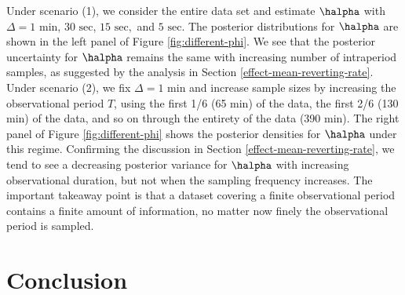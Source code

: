 Under scenario (1), we consider the entire data set and estimate $\halpha$ with $\Delta = 1 \mbox{ min}$, $30 \mbox{ sec}$, $15 \mbox{ sec},$ and $5 \mbox{ sec}$. The posterior distributions for $\halpha$ are shown in the left panel of Figure \ref{fig:different-phi}. We see that the posterior uncertainty for $\halpha$ remains the same with increasing number of intraperiod samples, as suggested by the analysis in Section \ref{effect-mean-reverting-rate}. Under scenario (2), we fix $\Delta = 1 \mbox{ min}$ and increase sample sizes by increasing the observational period $T$, using the first 1/6 (65 min) of the data, the first 2/6 (130 min) of the data, and so on through the entirety of the data (390 min). The right panel of Figure \ref{fig:different-phi} shows the posterior densities for $\halpha$ under this regime. Confirming the discussion in Section \ref{effect-mean-reverting-rate}, we tend to see a decreasing posterior variance for $\halpha$ with increasing observational duration, but not when the sampling frequency increases.  The important takeaway point is that a dataset covering a finite observational period contains a finite amount of information, no matter now finely the observational period is sampled.


\section{Conclusion}

